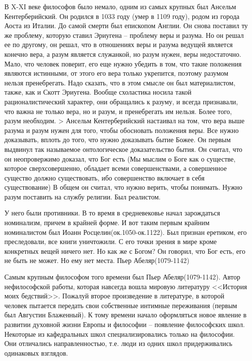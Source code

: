 В X-XI веке философов было немало, одним из самых крупных был Ансельм Кентерберийский. Он родился в 1033 году (умер в 1109 году), родом из города Аоста из Италии. До самой смерти был епископом Англии. Он снова поставил ту же проблему, которую ставил Эриугена – проблему веры и разума. Но он решал ее по другому, он решал, что в отношениях веры и разума ведущей является конечно вера, а разум является служанкой, но разум нужен, веры недостаточно. Мало, что человек поверит, его еще нужно убедить в том, что такие положения являются истинными, от этого его вера только укрепится, поэтому разумом нельзя пренебрегать. Надо сказать, что в этом смысле он был материалистом, также, как и Скотт Эриугена. Вообще схоластика носила такой рационалистический характер, они обращались к разуму, и всегда признавали, что важна не только вера, но и разум, и пренебрегать им нельзя. Более того, разум необходим. > Ансельм Кентерберийский настаивал на том, что вера выше разума и разум нужен для того, чтобы обосновать положения веры. Все нужно доказывать, вплоть до того, что нужно доказывать бытие Божее. Он первым выдвинул так называемое онтологическое доказательство бытия. Он считал, что он неопровержимо доказал, что Бог есть (Мы мыслим о Боге как о существе, которое сверхсовершенно, обладает всеми совершенствами, а совершенное существо должно существовать, ибо совершенство включает в себя существование) В общем он считал, что нужно верить, чтобы понимать. Нужно разум поставить на службу религии. Был реалистом.

У него были противники. В то время в средневековье начал зарождаться номинализм, причем в крайней форме. И вот таким первым крайним номиналистом был Иоанн Росцелин(ок.1050-ок.1122). Был признан еретиком, его преследовали, все книги уничтожили. С его точки зрения в мире кроме конкретных вещей ничего нет. Но как же с Богом? Он говорил, что Бог есть, его не быть не может. Но ему нет места.
Пьер Абеляр(1079-1142)

Самым крупным философом того времени был Пьер Абеляр(1079-1142). Автор нефилософской работы, которая навсегда вошла мировую литературу <<История моих бедствий>>. Пожалуй второе произведение в литературе, в которой человек пытается передать свои собственные интимные переживания (первым был Августин Блаженный). К тому времени начало оформляться новое явление в развитии духовной жизни Европы и философии – появление философских школ. Некоторые из кафедральных школ специализировались только на философии. Они отличались направленностью, т.е. люди из одних школ придерживались одинаковых взглядов.

